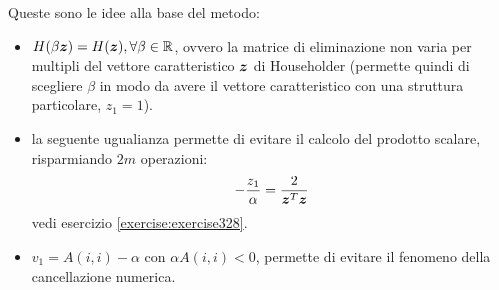 \begin{oss}
Queste sono le idee alla base del metodo:
\begin{itemize}
  \item $H(\beta \boldsymbol{z}) = H(\boldsymbol{z}), \forall \beta \in \mathbb{R}$, ovvero
  la matrice di eliminazione non varia per multipli del vettore caratteristico
  $\boldsymbol{z}$ di Householder (permette quindi di scegliere $\beta$ in modo
  da avere il vettore caratteristico con una struttura particolare, $z_{1} =
  1$).
  
  \item la seguente ugualianza permette di evitare il calcolo del prodotto
  scalare, risparmiando $2m$ operazioni:
  	\begin{displaymath}
  		-\frac{z_{1}}{\alpha} =
  		\frac{2}{\boldsymbol{z}^{T}\boldsymbol{z}}
  	\end{displaymath}
  vedi esercizio \ref{exercise:exercise328}.
  
  \item $v_{1} = A(i, i) - \alpha$ con $\alpha A(i, i) < 0$, permette di
  evitare il fenomeno della cancellazione numerica.
\end{itemize}
\end{oss}

